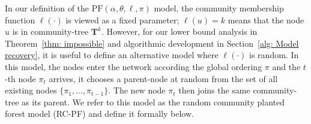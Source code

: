 \documentclass[twoside,11pt]{article}
\theoremstyle{remark}
\begin{document}

In our definition of the $\mathrm{PF}(\alpha, \theta, \ell, \pi)$ model, the community membership function $\ell(\cdot)$ is viewed as a fixed parameter; $\ell(u) = k$ means that the node $u$ is in community-tree $\bm{T}^k$. However, for our lower bound analysis in Theorem~\ref{thm: impossible} and algorithmic development in Section~\ref{alg: Model recovery}, it is useful to define an alternative model where $\ell(\cdot)$ is random. In this model, the nodes enter the network according the global ordering $\pi$ and the $t$-th node $\pi_t$ arrives, it chooses a parent-node at random from the set of all existing nodes $\{\pi_1, \ldots, \pi_{t-1}\}$. The new node $\pi_t$ then joins the same community-tree as its parent. We refer to this model as the random community planted forest model (RC-PF) and define it formally below.
\end{document}
